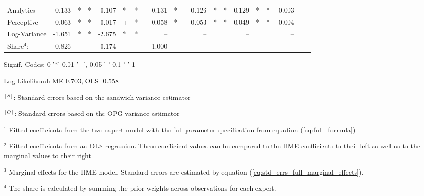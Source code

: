 \documentclass[12pt]{article}
\theoremstyle{definition}
\begin{document}
\begin{landscape}
\begin{table}
\begin{threeparttable}
\begin{tabular}[l]{l r l l r l l c r l c r l l r l l r l l}
  Analytics              &  0.133 & *   & *   &  0.107 & *   & *    &&  0.131 & *     &&  0.126 & *   & *    &  0.129  & *   & *   & -0.003 &     &   \\
  Perceptive             &  0.063 & *   & *   & -0.017 & +   & *    &&  0.058 & *     &&  0.053 & *   & *    &  0.049  & *   & *   &  0.004 &     &   \\
  Log-Variance           & -1.651 & *   & *   & -2.675 & *   & *    &&  --    &       &&  --    &     &      &  --     &     &     &  --    &     &   \\
                  \cmidrule(l){2-4} \cmidrule(l){5-7} \cmidrule(l){9-10} \cmidrule(l){12-14} \cmidrule(l){15-17} \cmidrule(l){18-20}
  Share$^{4}$:           &  0.826 &     &     &  0.174 &     &      &&  1.000 &       &&  --    &     &      &  --     &     &     &  --    &     &   \\
  \hline
        \end{tabular}
        \begin{tablenotes}
          \item Signif. Codes: 0 '*' 0.01 '+', 0.05 '-' 0.1 ' ' 1
          \item Log-Likelihood: ME 0.703, OLS -0.558
          \item $^{[S]}$: Standard errors based on the sandwich variance estimator
          \item $^{[O]}$: Standard errors based on the OPG variance estimator
          \item $^{1}$ Fitted coefficients from the two-expert model with the full parameter specification from equation (\ref{eq:full_formula})
          \item $^{2}$ Fitted coefficients from an OLS regression. These coefficient values can be compared to the HME coefficients to their left as well as to the marginal values to their right
          \item $^{3}$ Marginal effects for the HME model. Standard errors are estimated by equation (\ref{eq:std_errs_full_marginal_effects}).
          \item $^{4}$ The share is calculated by summing the prior weights across observations for each expert.
        \end{tablenotes} \label{tbl:2E_full_regressions_results}
      \end{threeparttable}
  \end{table}
  \end{landscape}
  
\end{document}
